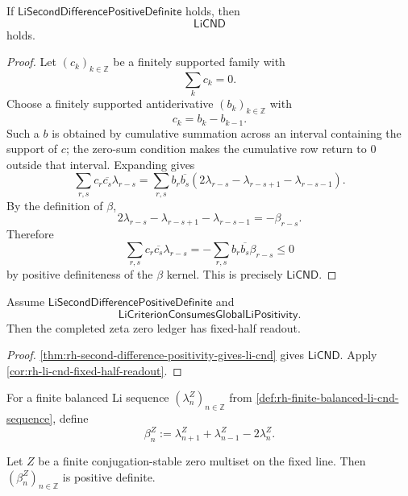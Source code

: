 \begin{theorem}
\label{thm:rh-second-difference-positivity-gives-li-cnd}
If $\mathsf{LiSecondDifferencePositiveDefinite}$ holds, then
$$
\mathsf{LiCND}
$$
holds.
\end{theorem}

\begin{proof}
Let $(c_k)_{k\in\mathbb Z}$ be a finitely supported family with
$$
\sum_k c_k=0.
$$
Choose a finitely supported antiderivative $(b_k)_{k\in\mathbb Z}$ with
$$
c_k=b_k-b_{k-1}.
$$
Such a $b$ is obtained by cumulative summation across an interval
containing the support of $c$; the zero-sum condition makes the
cumulative row return to $0$ outside that interval.  Expanding gives
$$
\sum_{r,s}c_r\overline{c_s}\lambda_{r-s}
=
\sum_{r,s}b_r\overline{b_s}
\left(
2\lambda_{r-s}-\lambda_{r-s+1}-\lambda_{r-s-1}
\right).
$$
By the definition of $\beta$,
$$
2\lambda_{r-s}-\lambda_{r-s+1}-\lambda_{r-s-1}
=
-\beta_{r-s}.
$$
Therefore
$$
\sum_{r,s}c_r\overline{c_s}\lambda_{r-s}
=
-
\sum_{r,s}b_r\overline{b_s}\beta_{r-s}
\le0
$$
by positive definiteness of the $\beta$ kernel.  This is precisely
$\mathsf{LiCND}$.
\end{proof}

\begin{corollary}
\label{cor:rh-second-difference-positivity-fixed-half-readout}
Assume $\mathsf{LiSecondDifferencePositiveDefinite}$ and
$$
\mathsf{LiCriterionConsumesGlobalLiPositivity}.
$$
Then the completed zeta zero ledger has fixed-half readout.
\end{corollary}

\begin{proof}
\autoref{thm:rh-second-difference-positivity-gives-li-cnd} gives
$\mathsf{LiCND}$.  Apply \autoref{cor:rh-li-cnd-fixed-half-readout}.
\end{proof}

\begin{definition}
\label{def:rh-finite-balanced-beta-kernel}
For a finite balanced Li sequence
$(\lambda_n^Z)_{n\in\mathbb Z}$ from
\autoref{def:rh-finite-balanced-li-cnd-sequence}, define
$$
\beta_n^Z
:=
\lambda_{n+1}^Z+\lambda_{n-1}^Z-2\lambda_n^Z.
$$
\end{definition}

\begin{theorem}
\label{thm:rh-balanced-critical-divisors-give-beta-positivity}
Let $Z$ be a finite conjugation-stable zero multiset on the fixed line.
Then $(\beta_n^Z)_{n\in\mathbb Z}$ is positive definite.
\end{theorem}

